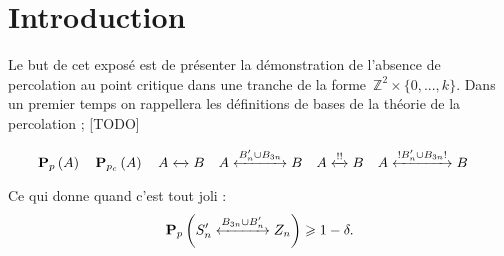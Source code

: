 		\chapter*{Introduction}
		Le but de cet exposé est de présenter la démonstration de l'absence de percolation au point critique dans une tranche de la forme~$\mathbb{Z}^2\times\{0,...,k\}$. Dans un premier temps on rappellera les définitions de bases de la théorie de la percolation ; [TODO]
		
		\[
			\Pp{A}							\quad
			\Pp[p_c]{A}						\quad
			\relie{A}{B}					\quad
			\relie[B_n'\cup B_{3n}]{A}{B}	\quad
			\relie*{A}{B}					\quad
			\relie*[B_n'\cup B_{3n}]{A}{B}	\quad
		\]
		
		Ce qui donne quand c'est tout joli :
		\[
			\Pp{\relie[B_{3n}\cup B_n']{S_n'}{Z_n}} \geq 1 - \delta.
		\]
		
		\Tbreak
